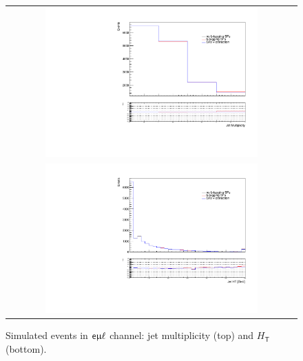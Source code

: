  \begin{figure}[tbh!]
 \begin{center}
 \begin{tabular}{c}
 \includegraphics[width=0.75\textwidth]{figures/Part3/Objects/njet_Btag}\\
 \includegraphics[width=0.75\textwidth]{figures/Part3/Objects/Ht_Btag} \\
 \end{tabular}
 \caption{Simulated events in $\textsf{e}\upmu\ell$ channel: jet multiplicity (top) and $H_\textsf{T}$ (bottom).}
 \label{fig:BtagSF}
 \end{center}
\end{figure}